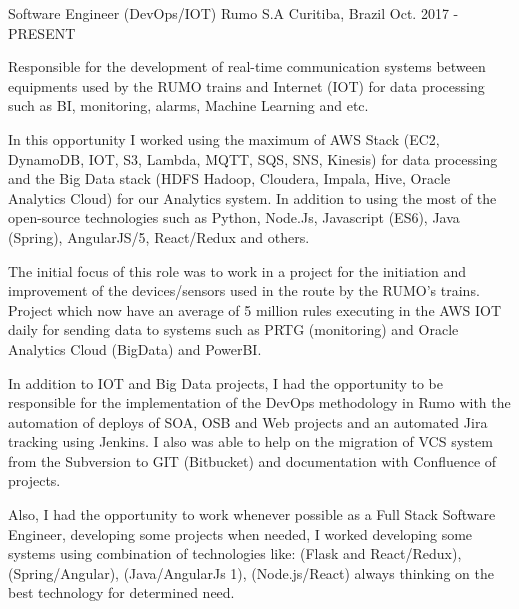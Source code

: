 

\begin{cventries}
  \cventry
    { Software Engineer (DevOps/IOT)} %
    {Rumo S.A} %
    {Curitiba, Brazil} %
    {Oct. 2017 - PRESENT} %
    {
    \begin{cvitems} %
        \item {
Responsible for the development of real-time communication systems between equipments used by the RUMO trains and Internet (IOT) for data processing such as BI, monitoring, alarms, Machine Learning and etc.
}
       \item {In this opportunity I worked using the maximum of AWS Stack (EC2, DynamoDB, IOT, S3, Lambda, MQTT, SQS, SNS, Kinesis) for data processing and the Big Data stack (HDFS Hadoop, Cloudera, Impala, Hive, Oracle Analytics Cloud) for our Analytics system. In addition to using the most of the open-source technologies such as Python, Node.Js, Javascript (ES6), Java (Spring), AngularJS/5, React/Redux and others.}
        \item {The initial focus of this role was to work in a project for the initiation and improvement of the devices/sensors used in the route by the RUMO's trains. Project which now have an average of 5 million rules executing in the AWS IOT daily for sending data to systems such as PRTG (monitoring) and Oracle Analytics Cloud (BigData) and PowerBI.}
          \item {In addition to IOT and Big Data projects, I had the opportunity to be responsible for the implementation of the DevOps methodology in Rumo with the automation of deploys of SOA, OSB and Web projects and an automated Jira tracking using Jenkins. I also was able to help on the migration of VCS system from the Subversion to GIT (Bitbucket) and documentation with Confluence of projects.}
          \item {Also, I had the opportunity to work whenever possible as a Full Stack Software Engineer, developing some projects when needed, I worked developing some systems using combination of technologies like: (Flask and React/Redux), (Spring/Angular), (Java/AngularJs 1), (Node.js/React) always thinking on the best technology for determined need.}

\end{cvitems}}
\end{cventries}
